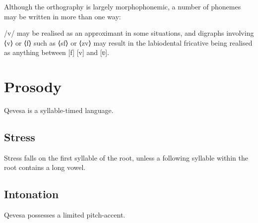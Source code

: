 \documentclass[grammar]{subfiles}
\begin{document}
  Although the orthography is largely morphophonemic, a number of phonemes may be written in more than one way:

  \begin{itemize*}
    \item /v/ may be realised as an approximant in some situations, and digraphs involving ⟨v⟩ or ⟨f⟩ such as ⟨sf⟩ or ⟨zv⟩ may result in the labiodental fricative being realised as anything between [f] [v] and [ʋ].
  \end{itemize*}

  \section{Prosody}
  \label{sec:prosody}

  Qevesa is a syllable-timed language.
  \ToBeWritten

  \subsection{Stress}
  \label{ssec:stress}

  Stress falls on the first syllable of the root, unless a following syllable within the root contains a long vowel.  \ToBeWritten

  \subsection{Intonation}
  \label{ssec:intonation}

  Qevesa possesses a limited pitch-accent.
  \ToBeWritten
\end{document}
